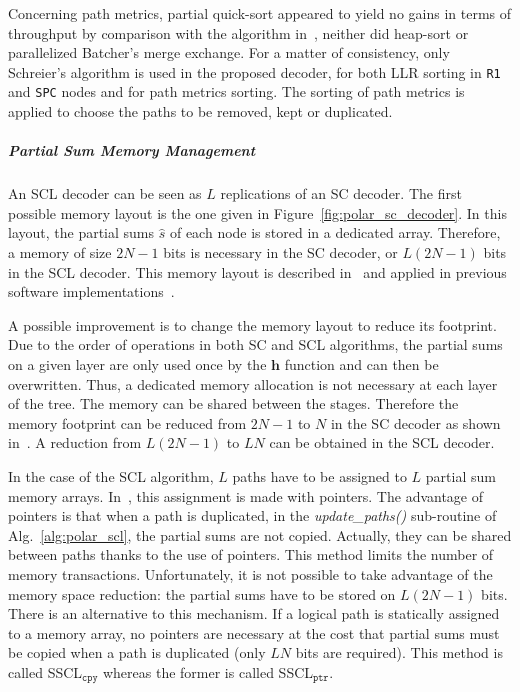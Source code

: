 Concerning path metrics, partial quick-sort appeared to yield no gains in terms
of throughput by comparison with the algorithm in~\cite{Schreier1932}, neither
did heap-sort or parallelized Batcher's merge exchange. For a matter of
consistency, only Schreier's algorithm is used in the proposed decoder, for both
LLR sorting in \texttt{R1} and \texttt{SPC} nodes and for path metrics sorting.
The sorting of path metrics is applied to choose the paths to be removed, kept
or duplicated.

\subparagraph{Partial Sum Memory Management}

An SCL decoder can be seen as $L$ replications of an SC decoder. The first
possible memory layout is the one given in Figure~\ref{fig:polar_sc_decoder}. In
this layout, the partial sums $\hat{s}$ of each node is stored in a dedicated
array. Therefore, a memory of size $2N-1$ bits is necessary in the SC decoder,
or $L(2N -1)$ bits in the SCL decoder. This memory layout is described
in~\cite{Tal2011} and applied in previous software
implementations~\cite{Sarkis2014b,Sarkis2016,Shen2016}.

A possible improvement is to change the memory layout to reduce its footprint.
Due to the order of operations in both SC and SCL algorithms, the partial sums
on a given layer are only used once by the $\bm{h}$ function and can then be
overwritten. Thus, a dedicated memory allocation is not necessary at each layer
of the tree. The memory can be shared between the stages. Therefore the memory
footprint can be reduced from $2N-1$ to $N$ in the SC decoder as shown
in~\cite{Leroux2013}. A reduction from $L(2N -1)$ to $LN$ can be obtained in the
SCL decoder.

In the case of the SCL algorithm, $L$ paths have to be assigned to $L$ partial
sum memory arrays. In~\cite{Tal2011}, this assignment is made with pointers. The
advantage of pointers is that when a path is duplicated, in the
\textit{update\_paths()} sub-routine of Alg.~\ref{alg:polar_scl}, the partial
sums are not copied. Actually, they can be shared between paths thanks to the
use of pointers. This method limits the number of memory transactions.
Unfortunately, it is not possible to take advantage of the memory space
reduction: the partial sums have to be stored on $L(2N -1)$ bits. There is an
alternative to this mechanism. If a logical path is statically assigned to a
memory array, no pointers are necessary at the cost that partial sums must be
copied when a path is duplicated (only $LN$ bits are required). This method is
called SSCL$_{\texttt{cpy}}$ whereas the former is called SSCL$_{\texttt{ptr}}$.

